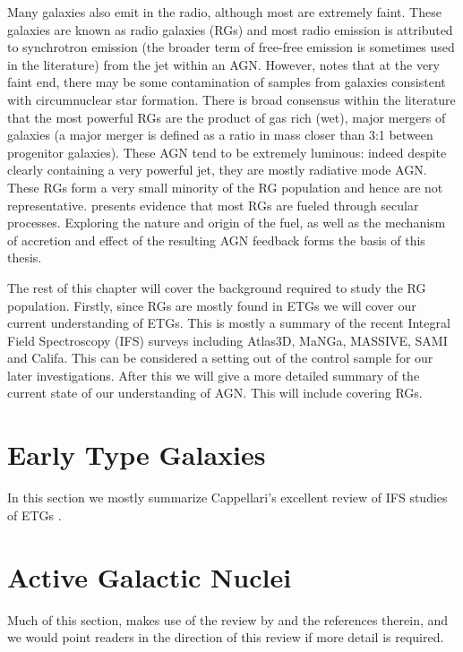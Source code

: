 Many galaxies also emit in the radio, although most are extremely faint. These galaxies are known as radio galaxies (RGs) and most radio emission is attributed to synchrotron emission (the broader term of free-free emission is sometimes used in the literature) from the jet within an AGN. However, \citet{Nyland2016} notes that at the very faint end, there may be some contamination of samples from galaxies consistent with circumnuclear star formation. There is broad consensus within the literature that the most powerful RGs are the product of gas rich (wet), major mergers of galaxies (a major merger is defined as a ratio in mass closer than 3:1 between progenitor galaxies). These AGN tend to be extremely luminous: indeed despite clearly containing a very powerful jet, they are mostly radiative mode AGN. These RGs form a very small minority of the RG population and hence are not representative. \citet{Heckman2014} presents evidence that most RGs are fueled through secular processes. Exploring the nature and origin of the fuel, as well as the mechanism of accretion and effect of the resulting AGN feedback forms the basis of this thesis. 

The rest of this chapter will cover the background required to study the RG population. Firstly, since RGs are mostly found in ETGs we will cover our current understanding of ETGs. This is mostly a summary of the recent Integral Field Spectroscopy (IFS) surveys including Atlas3D, MaNGa, MASSIVE, SAMI and Califa. This can be considered a setting out of the control sample for our later investigations. After this we will give a more detailed summary of the current state of our understanding of AGN. This will include covering RGs.

\section{Early Type Galaxies}
	\label{sec:introETG}
	In this section we mostly summarize Cappellari's excellent review of IFS studies of ETGs \citep{Cappellari2016}. 



\section{Active Galactic Nuclei}
	\label{sec:introAGN}
	Much of this section, makes use of the review by \citet{Heckman2014} and the references therein, and we would point readers in the direction of this review if more detail is required. 

